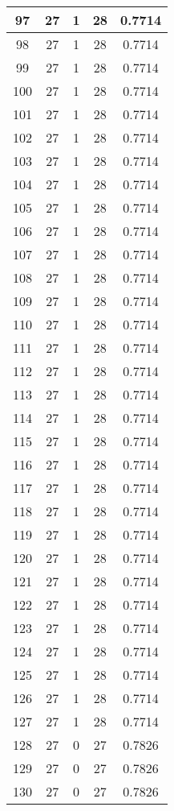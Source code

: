 \documentclass[letterpaper, 12pt]{article}
\begin{document}
\begin{longtable}{|c|c|c|c|c|}
\hline
97 & 27 & 1 & 28 & 0.7714 \\
\hline
98 & 27 & 1 & 28 & 0.7714 \\
\hline
99 & 27 & 1 & 28 & 0.7714 \\
\hline
100 & 27 & 1 & 28 & 0.7714 \\
\hline
101 & 27 & 1 & 28 & 0.7714 \\
\hline
102 & 27 & 1 & 28 & 0.7714 \\
\hline
103 & 27 & 1 & 28 & 0.7714 \\
\hline
104 & 27 & 1 & 28 & 0.7714 \\
\hline
105 & 27 & 1 & 28 & 0.7714 \\
\hline
106 & 27 & 1 & 28 & 0.7714 \\
\hline
107 & 27 & 1 & 28 & 0.7714 \\
\hline
108 & 27 & 1 & 28 & 0.7714 \\
\hline
109 & 27 & 1 & 28 & 0.7714 \\
\hline
110 & 27 & 1 & 28 & 0.7714 \\
\hline
111 & 27 & 1 & 28 & 0.7714 \\
\hline
112 & 27 & 1 & 28 & 0.7714 \\
\hline
113 & 27 & 1 & 28 & 0.7714 \\
\hline
114 & 27 & 1 & 28 & 0.7714 \\
\hline
115 & 27 & 1 & 28 & 0.7714 \\
\hline
116 & 27 & 1 & 28 & 0.7714 \\
\hline
117 & 27 & 1 & 28 & 0.7714 \\
\hline
118 & 27 & 1 & 28 & 0.7714 \\
\hline
119 & 27 & 1 & 28 & 0.7714 \\
\hline
120 & 27 & 1 & 28 & 0.7714 \\
\hline
121 & 27 & 1 & 28 & 0.7714 \\
\hline
122 & 27 & 1 & 28 & 0.7714 \\
\hline
123 & 27 & 1 & 28 & 0.7714 \\
\hline
124 & 27 & 1 & 28 & 0.7714 \\
\hline
125 & 27 & 1 & 28 & 0.7714 \\
\hline
126 & 27 & 1 & 28 & 0.7714 \\
\hline
127 & 27 & 1 & 28 & 0.7714 \\
\hline
128 & 27 & 0 & 27 & 0.7826 \\
\hline
129 & 27 & 0 & 27 & 0.7826 \\
\hline
130 & 27 & 0 & 27 & 0.7826 \\

\end{longtable}
\end{document}
